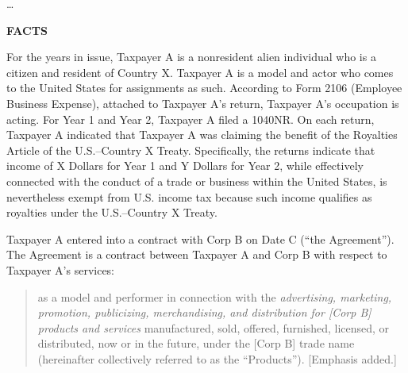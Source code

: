 \begin{select}
\ldots\\
\begin{center} \textbf{FACTS}
\end{center}
For the years in issue, Taxpayer A is a nonresident alien individual who is a
citizen and resident of Country X. Taxpayer A is a model and actor who comes to
the United States for assignments as such. According to Form 2106 (Employee
Business Expense), attached to Taxpayer A's return, Taxpayer A's occupation is
acting. For Year 1 and Year 2, Taxpayer A filed a 1040NR. On each return,
Taxpayer A indicated that Taxpayer A was claiming the benefit of the Royalties
Article of the U.S.--Country X Treaty. Specifically, the returns indicate that income
of X Dollars for Year 1 and Y Dollars for Year 2, while effectively connected with the
conduct of a trade or business within the United States, is nevertheless exempt
from U.S. income tax because such income qualifies as royalties under the U.S.--Country X Treaty.

Taxpayer A entered into a contract with Corp B on Date C (``the Agreement''). 
The Agreement is a contract between Taxpayer A and Corp B with respect to
Taxpayer A's services:
\begin{quotation}
as a model and performer in connection with the \emph{advertising, marketing,
promotion, publicizing, merchandising, and distribution for [Corp B] products and services} manufactured, sold, offered, furnished, licensed, or distributed,
now or in the future, under the [Corp B] trade name (hereinafter collectively
referred to as the ``Products''). [Emphasis added.]
\end{quotation} 


\end{select}
